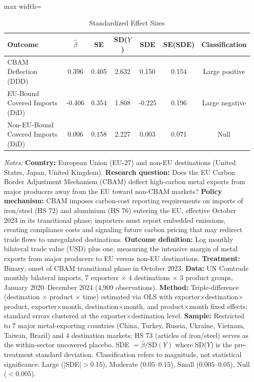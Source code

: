\begin{table}[htbp]
\centering
\caption{Standardized Effect Sizes}
\label{tab:sde}
\begin{adjustbox}{max width=\textwidth}
\begin{tabular}{lcccccc}
\hline\hline
Outcome & $\hat{\beta}$ & SE & SD($Y$) & SDE & SE(SDE) & Classification \\
\hline
CBAM Deflection (DDD) & 0.396 & 0.405 & 2.632 & 0.150 & 0.154 & Large positive \\
EU-Bound Covered Imports (DiD) & -0.406 & 0.354 & 1.808 & -0.225 & 0.196 & Large negative \\
Non-EU-Bound Covered Imports (DiD) & 0.006 & 0.158 & 2.227 & 0.003 & 0.071 & Null \\
\hline\hline
\end{tabular}
\end{adjustbox}
\begin{tablenotes}[flushleft]
\small
\item \textit{Notes:} \textbf{Country:} European Union (EU-27) and non-EU destinations (United States, Japan, United Kingdom). \textbf{Research question:} Does the EU Carbon Border Adjustment Mechanism (CBAM) deflect high-carbon metal exports from major producers away from the EU toward non-CBAM markets? \textbf{Policy mechanism:} CBAM imposes carbon-cost reporting requirements on imports of iron/steel (HS 72) and aluminium (HS 76) entering the EU, effective October 2023 in its transitional phase; importers must report embedded emissions, creating compliance costs and signaling future carbon pricing that may redirect trade flows to unregulated destinations. \textbf{Outcome definition:} Log monthly bilateral trade value (USD) plus one, measuring the intensive margin of metal exports from major producers to EU versus non-EU destinations. \textbf{Treatment:} Binary; onset of CBAM transitional phase in October 2023. \textbf{Data:} UN Comtrade monthly bilateral imports, 7 exporters $\times$ 4 destinations $\times$ 3 product groups, January 2020--December 2024 (4,909 observations). \textbf{Method:} Triple-difference (destination $\times$ product $\times$ time) estimated via OLS with exporter$\times$destination$\times$product, exporter$\times$month, destination$\times$month, and product$\times$month fixed effects; standard errors clustered at the exporter$\times$destination level. \textbf{Sample:} Restricted to 7 major metal-exporting countries (China, Turkey, Russia, Ukraine, Vietnam, Taiwan, Brazil) and 4 destination markets; HS 73 (articles of iron/steel) serves as the within-sector uncovered placebo. SDE $= \hat{\beta} / \text{SD}(Y)$ where SD($Y$) is the pre-treatment standard deviation. Classification refers to magnitude, not statistical significance: Large ($|$SDE$| > 0.15$), Moderate ($0.05$--$0.15$), Small ($0.005$--$0.05$), Null ($< 0.005$). 
\end{tablenotes}
\end{table}
